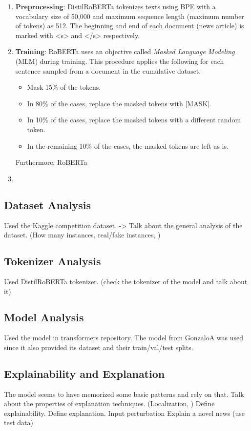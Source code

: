 \begin{enumerate}
    \item \textbf{Preprocessing}: DistilRoBERTa tokenizes texts using BPE with a vocabulary size of 50,000 and maximum sequence length (maximum number of tokens) as 512. The beginning and end of each document (news article) is marked with <s> and </s> respectively.
    \item \textbf{Training}: RoBERTa uses an objective called \emph{Masked Language Modeling} (MLM) during training. This procedure applies the following for each sentence sampled from a document in the cumulative dataset.
          \begin{itemize}
              \item Mask 15\% of the tokens.
              \item In 80\% of the cases, replace the masked tokens with [MASK].
              \item In 10\% of the cases, replace the masked tokens with a different random token.
              \item In the remaining 10\% of the cases, the masked tokens are left as is.
          \end{itemize}
          Furthermore, RoBERTa
    \item
\end{enumerate}


\subsection{Dataset Analysis}
\label{subsec:newsContentModels_Dataset}
Used the Kaggle competition dataset.
-> Talk about the general analysis of the dataset. (How many instances, real/fake instances, )

\subsection{Tokenizer Analysis}
\label{subsec:newsContentModels_Tokenizer}
Used DistilRoBERTa tokenizer. (check the tokenizer of the model and talk about it)

\subsection{Model Analysis}
\label{subsec:newsContentModels_Model}
Used the model in transformers repository. The model from GonzaloA was used since it also provided its dataset and their train/val/test splits.

\subsection{Explainability and Explanation}
The model seems to have memorized some basic patterns and rely on that.
Talk about the properties of explanation techniques. (Localization, )
Define explainability. Define explanation.
Input perturbation
Explain a novel news (use test data)

